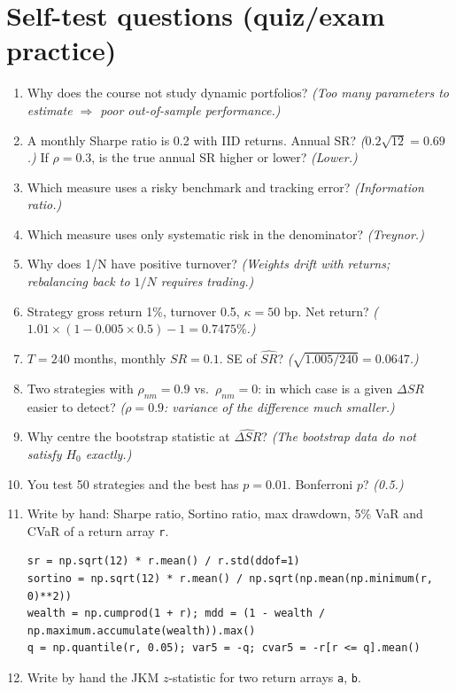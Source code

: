 \documentclass[11pt,a4paper]{report}
\begin{document}
\section{Self-test questions (quiz/exam practice)}
\begin{enumerate}
  \item Why does the course not study dynamic portfolios? \emph{(Too many
    parameters to estimate $\Rightarrow$ poor out-of-sample performance.)}
  \item A monthly Sharpe ratio is 0.2 with IID returns. Annual SR?
    \emph{($0.2\sqrt{12}=0.69$.)} If $\rho=0.3$, is the true annual SR higher or
    lower? \emph{(Lower.)}
  \item Which measure uses a risky benchmark and tracking error? \emph{(Information ratio.)}
  \item Which measure uses only systematic risk in the denominator? \emph{(Treynor.)}
  \item Why does 1/N have positive turnover? \emph{(Weights drift with returns;
    rebalancing back to $1/N$ requires trading.)}
  \item Strategy gross return 1\%, turnover 0.5, $\kappa=50$ bp. Net return?
    \emph{($1.01\times(1-0.005\times0.5)-1=0.7475\%$.)}
  \item $T=240$ months, monthly $SR=0.1$. SE of $\widehat{SR}$? \emph{($\sqrt{1.005/240}=0.0647$.)}
  \item Two strategies with $\rho_{nm}=0.9$ vs.\ $\rho_{nm}=0$: in which case is a
    given $\Delta SR$ easier to detect? \emph{($\rho=0.9$: variance of the difference much smaller.)}
  \item Why centre the bootstrap statistic at $\widehat{\Delta SR}$? \emph{(The
    bootstrap data do not satisfy $H_0$ exactly.)}
  \item You test 50 strategies and the best has $p=0.01$. Bonferroni $p$? \emph{(0.5.)}
  \item Write by hand: Sharpe ratio, Sortino ratio, max drawdown, 5\% VaR and CVaR of a return array \texttt{r}.
\begin{lstlisting}
sr = np.sqrt(12) * r.mean() / r.std(ddof=1)
sortino = np.sqrt(12) * r.mean() / np.sqrt(np.mean(np.minimum(r, 0)**2))
wealth = np.cumprod(1 + r); mdd = (1 - wealth / np.maximum.accumulate(wealth)).max()
q = np.quantile(r, 0.05); var5 = -q; cvar5 = -r[r <= q].mean()
\end{lstlisting}
  \item Write by hand the JKM $z$-statistic for two return arrays \texttt{a}, \texttt{b}.

\end{enumerate}
\end{document}
